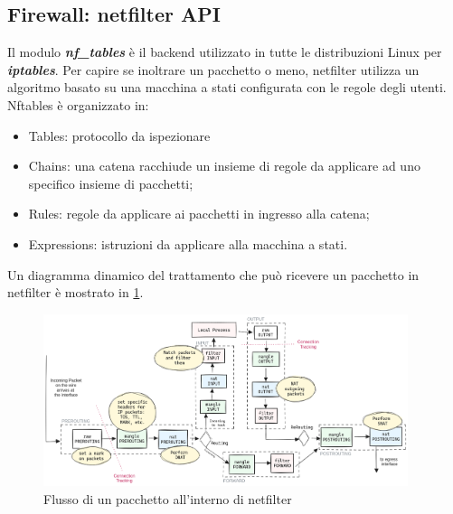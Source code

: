 \documentclass{article}
\begin{document}
\subsection{Firewall: netfilter API}
Il modulo \textbf{\textit{nf\_tables}} è il backend utilizzato in tutte le distribuzioni 
Linux per \textbf{\textit{iptables}}. Per capire se inoltrare un pacchetto o meno,
netfilter utilizza un algoritmo basato su una macchina a stati configurata con le regole 
degli utenti. Nftables è organizzato in:
\begin{itemize}
  \item Tables: protocollo da ispezionare
  \item Chains: una catena racchiude un insieme di regole da applicare ad uno specifico insieme di 
    pacchetti;
  \item Rules: regole da applicare ai pacchetti in ingresso alla catena;
  \item Expressions: istruzioni da applicare alla macchina a stati.
\end{itemize}

Un diagramma dinamico del trattamento che può ricevere un pacchetto in netfilter è mostrato 
in \cref{fig:nf_flow}.

\begin{figure}[h]
  \begin{center}
    \includegraphics[width=0.95\textwidth]{figures/ch1/Diagrama_linux_netfilter_iptables.png}
  \end{center}
  \caption{Flusso di un pacchetto all'interno di netfilter}\label{fig:nf_flow}
\end{figure}
\end{document}
